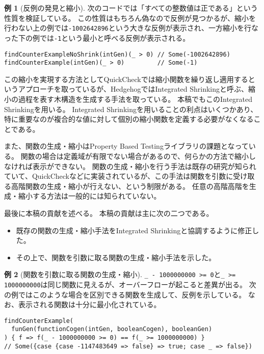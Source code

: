 \documentclass[a4paper,xelatex,ja=standard,jafont=noto]{bxjsarticle}
\theoremstyle{definition}
\newtheorem{example}{例}
\begin{document}
\begin{example}[反例の発見と縮小]
次のコードでは「すべての整数値は正である」という性質を検証している。
この性質はもちろん偽なので反例が見つかるが、縮小を行わない上の例では\texttt{-1002642896}という大きな反例が表示され、一方縮小を行なった下の例では\texttt{-1}という最小と呼べる反例が表示される。

\begin{verbatim}
findCounterExampleNoShrink(intGen)(_ > 0) // Some(-1002642896)
findCounterExample(intGen)(_ > 0)         // Some(-1)
\end{verbatim}
\end{example}

この縮小を実現する方法としてQuickCheckでは縮小関数を繰り返し適用するというアプローチを取っているが、Hedgehog\cite{hedgehog_online}ではIntegrated Shrinkingと呼ぶ、縮小の過程を表す木構造を生成する手法を取っている。
本稿でもこのIntegrated Shrinkingを用いる。
Integrated Shrinkingを用いることの利点はいくつかあり、特に重要なのが複合的な値に対して個別の縮小関数を定義する必要がなくなることである。

また、関数の生成・縮小はProperty Based Testingライブラリの課題となっている。
関数の場合は定義域が有限でない場合があるので、何らかの方法で縮小しなければ表示ができない。
関数の生成・縮小を行う手法は既存の研究\cite{claessen_shrinking_2012,koopman_automatic_2006}が知られていて、QuickCheckなどに実装されているが、この手法は関数を引数に受け取る高階関数の生成・縮小が行えない、という制限がある。
任意の高階高階を生成・縮小する方法は一般的には知られていない。

最後に本稿の貢献を述べる。
本稿の貢献は主に次の二つである。

\begin{itemize}
  \item 既存の関数の生成・縮小手法をIntegrated Shrinkingと協調するように修正した。
  \item その上で、関数を引数に取る関数の生成・縮小手法を示した。
\end{itemize}

\begin{example}[関数を引数に取る関数の生成・縮小]\label{exm:shrink}
\texttt{\_ - 1000000000 >= 0}と\texttt{\_ >= 1000000000}は同じ関数に見えるが、オーバーフローが起こると差異が出る。
次の例ではこのような場合を区別できる関数を生成して、反例を示している。
なお、表示される関数は十分に最小化されている。

\begin{verbatim}
findCounterExample(
  funGen(functionCogen(intGen, booleanCogen), booleanGen)
) { f => f(_ - 1000000000 >= 0) == f(_ >= 1000000000) }
// Some({case {case -1147483649 => false} => true; case _ => false})
\end{verbatim}
\end{example}
\end{document}
